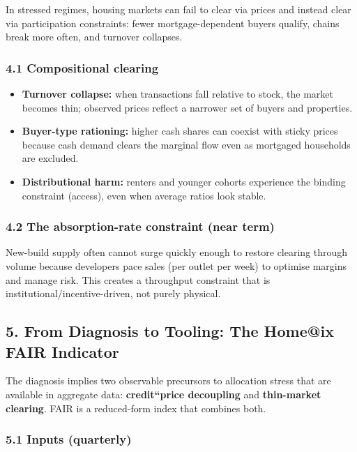 \documentclass[
]{article}
\providecommand{\tightlist}{%
  \setlength{\itemsep}{0pt}\setlength{\parskip}{0pt}}
\begin{document}
In stressed regimes, housing markets can fail to clear via prices and
instead clear via participation constraints: fewer mortgage-dependent
buyers qualify, chains break more often, and turnover collapses.

\subsubsection{4.1 Compositional clearing}\label{compositional-clearing}

\begin{itemize}
\tightlist
\item
  \textbf{Turnover collapse:} when transactions fall relative to stock,
  the market becomes thin; observed prices reflect a narrower set of
  buyers and properties.
\item
  \textbf{Buyer-type rationing:} higher cash shares can coexist with
  sticky prices because cash demand clears the marginal flow even as
  mortgaged households are excluded.
\item
  \textbf{Distributional harm:} renters and younger cohorts experience
  the binding constraint (access), even when average ratios look stable.
\end{itemize}

\subsubsection{4.2 The absorption-rate constraint (near
term)}\label{the-absorption-rate-constraint-near-term}

New-build supply often cannot surge quickly enough to restore clearing
through volume because developers pace sales (per outlet per week) to
optimise margins and manage risk. This creates a throughput constraint
that is institutional/incentive-driven, not purely physical.

\subsection{5. From Diagnosis to Tooling: The Home@ix FAIR
Indicator}\label{from-diagnosis-to-tooling-the-homeix-fair-indicator}

The diagnosis implies two observable precursors to allocation stress
that are available in aggregate data: \textbf{credit``price decoupling}
and \textbf{thin-market clearing}. FAIR is a reduced-form index that
combines both.

\subsubsection{5.1 Inputs (quarterly)}\label{inputs-quarterly}
\end{document}
